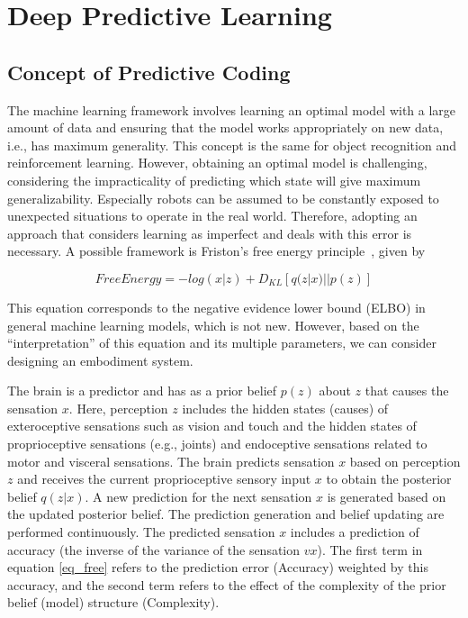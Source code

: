 \section{Deep Predictive Learning}

\subsection{Concept of Predictive Coding}
The machine learning framework involves learning an optimal model with a large amount of data and ensuring that the model works appropriately on new data, i.e., has maximum generality. This concept is the same for object recognition and reinforcement learning. However, obtaining an optimal model is challenging, considering the impracticality of predicting which state will give maximum generalizability. Especially robots can be assumed to be constantly exposed to unexpected situations to operate in the real world. Therefore, adopting an approach that considers learning as imperfect and deals with this error is necessary. A possible framework is Friston's free energy principle~\cite{friston2012perception}, given by 

\begin{equation}
    FreeEnergy = -log(x|z) + D_{KL}[q(z|x)||p(z)] \label{eq_free}
\end{equation}

This equation corresponds to the negative evidence lower bound (ELBO) in general machine learning models, which is not new. However, based on the ``interpretation'' of this equation and its multiple parameters, we can consider designing an embodiment system.

The brain is a predictor and has as a prior belief $p(z)$ about $z$ that causes the sensation $x$. Here, perception $z$ includes the hidden states (causes) of exteroceptive sensations such as vision and touch and the hidden states of proprioceptive sensations (e.g., joints) and endoceptive sensations related to motor and visceral sensations. The brain predicts sensation $x$ based on perception $z$ and receives the current proprioceptive sensory input $x$ to obtain the posterior belief $q(z|x)$. A new prediction for the next sensation $x$ is generated based on the updated posterior belief. The prediction generation and belief updating are performed continuously. The predicted sensation $x$ includes a prediction of accuracy (the inverse of the variance of the sensation $vx$). The first term in equation \ref{eq_free} refers to the prediction error (Accuracy) weighted by this accuracy, and the second term refers to the effect of the complexity of the prior belief (model) structure (Complexity).

